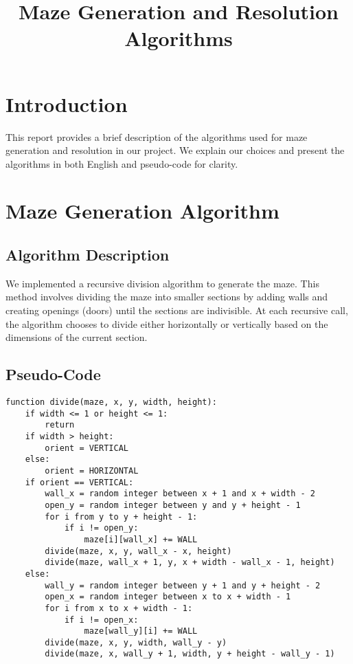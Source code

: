 \documentclass{article}
\begin{document}
\title{Maze Generation and Resolution Algorithms}
\author{}
\date{}
\maketitle

\section*{Introduction}

This report provides a brief description of the algorithms used for maze generation and resolution in our project. We explain our choices and present the algorithms in both English and pseudo-code for clarity.

\section*{Maze Generation Algorithm}

\subsection*{Algorithm Description}

We implemented a recursive division algorithm to generate the maze. This method involves dividing the maze into smaller sections by adding walls and creating openings (doors) until the sections are indivisible. At each recursive call, the algorithm chooses to divide either horizontally or vertically based on the dimensions of the current section.

\subsection*{Pseudo-Code}

\begin{verbatim}
function divide(maze, x, y, width, height):
    if width <= 1 or height <= 1:
        return
    if width > height:
        orient = VERTICAL
    else:
        orient = HORIZONTAL
    if orient == VERTICAL:
        wall_x = random integer between x + 1 and x + width - 2
        open_y = random integer between y and y + height - 1
        for i from y to y + height - 1:
            if i != open_y:
                maze[i][wall_x] += WALL
        divide(maze, x, y, wall_x - x, height)
        divide(maze, wall_x + 1, y, x + width - wall_x - 1, height)
    else:
        wall_y = random integer between y + 1 and y + height - 2
        open_x = random integer between x to x + width - 1
        for i from x to x + width - 1:
            if i != open_x:
                maze[wall_y][i] += WALL
        divide(maze, x, y, width, wall_y - y)
        divide(maze, x, wall_y + 1, width, y + height - wall_y - 1)
\end{verbatim}
\end{document}
